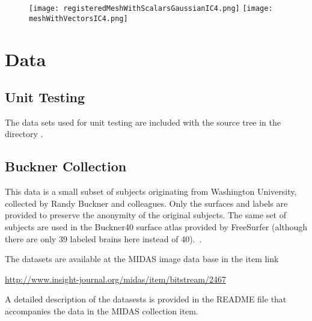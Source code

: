 \documentclass{InsightArticle}
\begin{document}
\begin{figure}
\center
\texttt{[image: registeredMeshWithScalarsGaussianIC4.png]}
\texttt{[image: meshWithVectorsIC4.png]}
\label{fig:OutputMeshes}
\end{figure}


\clearpage


\section{Data}

\subsection{Unit Testing}

The data sets used for unit testing are included with the source tree in the
directory .

\subsection{Buckner Collection}

This data is a small subset of subjects originating from Washington University,
collected by Randy Buckner and colleagues. Only the surfaces and labels are
provided to preserve the anonymity of the original subjects. The same set of
subjects are used in the Buckner40 surface atlas provided by FreeSurfer
(although there are only 39 labeled brains here instead of
40).~\cite{Desikan2006,Dale1999,Fischl1999,Fischl2001}.

The datasets are available at the MIDAS image data base in the item link

\begin{center}
\url{http://www.insight-journal.org/midas/item/bitstream/2467}
\end{center}

A detailed description of the datasests is provided in the README file that
accompanies the data in the MIDAS collection item.

\clearpage


%
%



\end{document}
